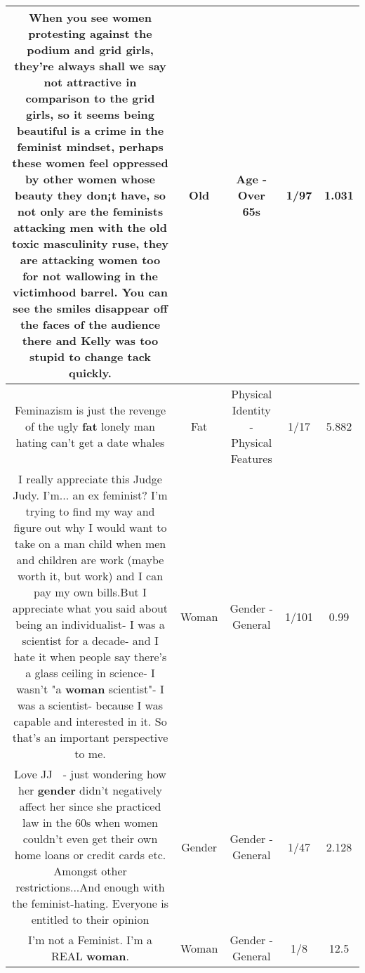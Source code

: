 \documentclass[11pt]{article}
\newlength\mylength
\begin{document}
\begin{center}
\begin{longtable}{|C{.65\mylength}|C{.30\mylength}|C{.12\mylength}|C{.12\mylength}|C{.12\mylength}|}
  \small When you see women protesting against the podium and grid girls, they're always shall we say not attractive in comparison to the grid girls, so it seems being beautiful is a crime in the feminist mindset, perhaps these women feel oppressed by other women whose beauty they don¡t have, so not only are the feminists attacking men with the \textbf{old} toxic masculinity ruse, they are attacking women too for not wallowing in the victimhood barrel. You can see the smiles disappear off the faces of the audience there and Kelly was too stupid to change tack quickly.\normalsize   & Old & Age - Over 65s & 1/97 & 1.031 \\  \hline
  \small Feminazism is just the revenge of the ugly \textbf{fat} lonely man hating can't get a date whales\normalsize   & Fat & Physical Identity - Physical Features & 1/17 & 5.882 \\  \hline
  \small I really appreciate this Judge Judy. I'm... an ex feminist? I'm trying to find my way and figure out why I would want to take on a man child when men and children are work (maybe worth it, but work) and I can pay my own bills.But I appreciate what you said about being an individualist- I was a scientist for a decade- and I hate it when people say there's a glass ceiling in science- I wasn't "a \textbf{woman} scientist"- I was a scientist- because I was capable and interested in it. So that's an important perspective to me.\normalsize   & Woman & Gender - General & 1/101 & 0.99 \\  \hline
  \small Love JJ 💛 - just wondering how her \textbf{gender} didn't negatively affect her since she practiced law in the 60s when women couldn't even get their own home loans or credit cards etc. Amongst other restrictions...And enough with the feminist-hating. Everyone is entitled to their opinion\normalsize   & Gender & Gender - General & 1/47 & 2.128 \\  \hline
  \small I'm not a Feminist. I'm a REAL \textbf{woman}.\normalsize   & Woman & Gender - General & 1/8 & 12.5 \\  \hline

\end{longtable}
\end{center}
\end{document}
